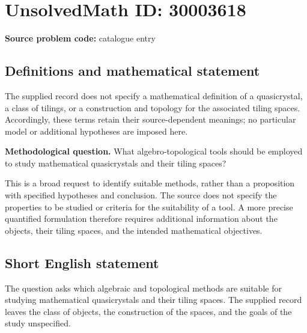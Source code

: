 \documentclass[11pt]{article}
\begin{document}
\section*{UnsolvedMath ID: 30003618}
\textbf{Source problem code:} catalogue entry
\subsection{Definitions and mathematical statement}
The supplied record does not specify a mathematical definition of a quasicrystal, a class of tilings, or a construction and topology for the associated tiling spaces. Accordingly, these terms retain their source-dependent meanings; no particular model or additional hypotheses are imposed here.

\textbf{Methodological question.} What algebro-topological tools should be employed to study mathematical quasicrystals and their tiling spaces?

This is a broad request to identify suitable methods, rather than a proposition with specified hypotheses and conclusion. The source does not specify the properties to be studied or criteria for the suitability of a tool. A more precise quantified formulation therefore requires additional information about the objects, their tiling spaces, and the intended mathematical objectives.
\subsection{Short English statement}
The question asks which algebraic and topological methods are suitable for studying mathematical quasicrystals and their tiling spaces. The supplied record leaves the class of objects, the construction of the spaces, and the goals of the study unspecified.
\end{document}
